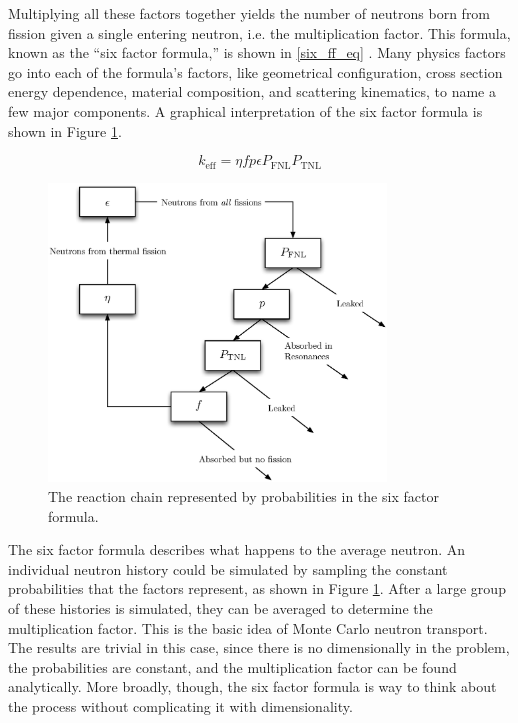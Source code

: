 Multiplying all these factors together yields the number of neutrons born from fission given a single entering neutron, i.e. the multiplication factor.  This formula, known as the ``six factor formula,'' is shown in \eqref{six_ff_eq} \cite{duderstadt}.  Many physics factors go into each of the formula's factors, like geometrical configuration, cross section energy dependence, material composition, and scattering kinematics, to name a few major components.  A graphical interpretation of the six factor formula is shown in Figure \ref{six_ff_chain}.

\begin{equation}
\label{six_ff_eq}
k_\mathrm{eff}  = \eta f p  \epsilon P_\mathrm{FNL} P_\mathrm{TNL}
\end{equation}


\begin{figure}[h!]
  \centering
    \includegraphics[width=0.8\textwidth]{graphics/six_ff.eps}
     \caption{The reaction chain represented by probabilities in the six factor formula. \label{six_ff_chain}}
\end{figure}

The six factor formula describes what happens to the average neutron. An individual neutron history could be simulated by sampling the constant probabilities that the factors represent, as shown in Figure \ref{six_ff_chain}.  After a large group of these histories is simulated, they can be averaged to determine the multiplication factor.  This is the basic idea of Monte Carlo neutron transport.  The results are trivial in this case, since there is no dimensionally in the problem, the probabilities are constant, and the multiplication factor can be found analytically.  More broadly, though, the six factor formula is way to think about the process without complicating it with dimensionality.


